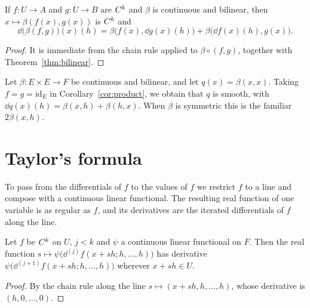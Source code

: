 \begin{corollary}
  \label{cor:product}
  \leanok
  If $f \colon U \to A$ and $g \colon U \to B$ are $C^{k}$ and $\beta$ is continuous and
  bilinear, then $x \mapsto \beta(f(x), g(x))$ is $C^{k}$ and
  \[
    \dd\bigl(\beta(f, g)\bigr)(x)(h) = \beta\bigl(f(x), \dd g(x)(h)\bigr)
      + \beta\bigl(\dd f(x)(h), g(x)\bigr).
  \]
\end{corollary}

\begin{proof}
  \leanok
  It is immediate from the chain rule applied to $\beta \circ (f, g)$, together with
  Theorem~\ref{thm:bilinear}.
\end{proof}

\begin{example}
  Let $\beta \colon E \times E \to F$ be continuous and bilinear, and let
  $q(x) = \beta(x, x)$. Taking $f = g = \mathrm{id}_E$ in Corollary~\ref{cor:product}, we
  obtain that $q$ is smooth, with $\dd q(x)(h) = \beta(x, h) + \beta(h, x)$. When $\beta$ is
  symmetric this is the familiar $2\beta(x, h)$.
\end{example}

\section{Taylor's formula}

To pass from the differentials of $f$ to the values of $f$ we restrict $f$ to a line and
compose with a continuous linear functional. The resulting real function of one variable is
as regular as $f$, and its derivatives are the iterated differentials of $f$ along the line.

\begin{lemma}
  \label{lem:line}
  \leanok
  Let $f$ be $C^{k}$ on $U$, $j < k$ and $\psi$ a continuous linear functional on $F$. Then
  the real function $s \mapsto \psi\bigl(\dd^{(j)} f(x + sh; h, \dots, h)\bigr)$ has derivative
  $\psi\bigl(\dd^{(j+1)} f(x + sh; h, \dots, h)\bigr)$ wherever $x + sh \in U$.
\end{lemma}

\begin{proof}
  \leanok
  By the chain rule along the line $s \mapsto (x + sh, h, \dots, h)$, whose derivative is
  $(h, 0, \dots, 0)$.
\end{proof}

